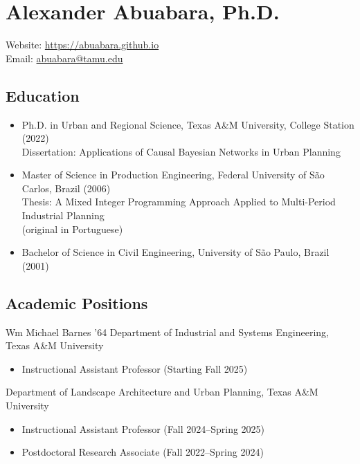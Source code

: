 \documentclass[11pt]{article}
\begin{document}
\raggedright

\section*{Alexander Abuabara, Ph.D.}
Website: \url{https://abuabara.github.io}\\[1pt]
Email: \href{mailto:abuabara@tamu.edu}{abuabara@tamu.edu}

\subsection*{Education}
\begin{itemize}[leftmargin=20pt]
\item Ph.D. in Urban and Regional Science, Texas A\&M University, College Station (2022)\\[1pt]
      Dissertation: Applications of Causal Bayesian Networks in Urban Planning
\item Master of Science in Production Engineering, Federal University of São Carlos, Brazil (2006)\\[1pt]
      Thesis: A Mixed Integer Programming Approach Applied to Multi-Period Industrial Planning\\
      {\small (original in Portuguese)}
\item Bachelor of Science in Civil Engineering, University of São Paulo, Brazil (2001)
\end{itemize}

\subsection*{Academic Positions}
Wm Michael Barnes ’64 Department of Industrial and Systems Engineering, Texas A\&M University
\begin{itemize}[leftmargin=20pt]
\item Instructional Assistant Professor (Starting Fall 2025)
\end{itemize}

\vspace{3pt}

Department of Landscape Architecture and Urban Planning, Texas A\&M University
\begin{itemize}[leftmargin=20pt]
\item Instructional Assistant Professor (Fall 2024--Spring 2025)
\item Postdoctoral Research Associate (Fall 2022--Spring 2024)
\end{itemize}
\end{document}
